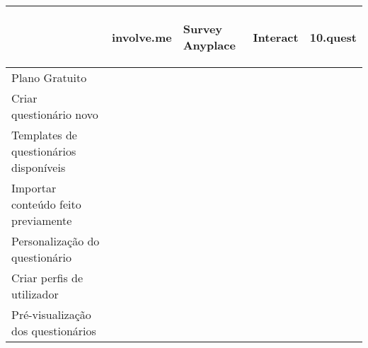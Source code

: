 	
\renewcommand{\arraystretch}{2}
\setlength\arrayrulewidth{1pt}
\begin{table}[!ht]  
	\begin{center}
		\begin{tabular}{|p{4cm}|p{0.1cm}|p{0.1cm}|p{0.1cm}|p{0.1cm}|}
			\cline{2-5}
			\multicolumn{1}{c|}{} & \hspace{0.2cm}\begin{sideways}involve.me\end{sideways} & \hspace{0.4cm}\begin{sideways}Survey Anyplace\end{sideways} & \hspace{0.2cm}\begin{sideways}Interact\end{sideways} &\hspace{0.2cm}\begin{sideways} 10.quest\end{sideways}\\ \hline
			
			
			Plano Gratuito & \cellcolor{yellow!80}   & \cellcolor{red!80}  & \cellcolor{red!80} & \cellcolor{yellow!80}  \\ \hline
			
			Criar questionário novo & \cellcolor{green!80}  & \cellcolor{green!80}  & \cellcolor{green!80} & \cellcolor{green!80} \\ \hline
			
			Templates de questionários disponíveis& \cellcolor{green!80}  & \cellcolor{green!80} & \cellcolor{green!80} & \cellcolor{red!80}  \\ \hline		
			
			Importar conteúdo feito previamente & \cellcolor{red!80}   & \cellcolor{red!80}  & \cellcolor{red!80} & \cellcolor{green!80}  \\ \hline
			
			Personalização do questionário & \cellcolor{green!80}  & \cellcolor{green!80}  & \cellcolor{green!80} & \cellcolor{green!80} \\ \hline
			
			
			Criar perfis de utilizador & \cellcolor{red!80}   & \cellcolor{red!80}  & \cellcolor{red!80} & \cellcolor{green!80}  \\ \hline
			
			Pré-visualização dos questionários &\cellcolor{green!80}  & \cellcolor{green!80} & \cellcolor{green!80} & \cellcolor{green!80}  \\ \hline
			

\end{tabular}
\end{center}
\end{table}
